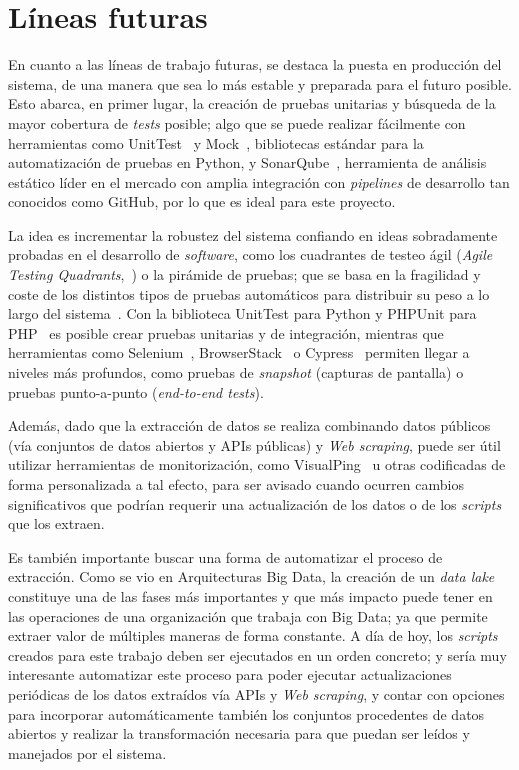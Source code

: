 \section{Líneas futuras}

En cuanto a las líneas de trabajo futuras, se destaca la puesta en producción del sistema, de una manera que sea lo más estable y preparada para el futuro posible. Esto abarca, en primer lugar, la creación de pruebas unitarias y búsqueda de la mayor cobertura de \textit{tests} posible; algo que se puede realizar fácilmente con herramientas como UnitTest~\cite{unittest} y Mock~\cite{mock}, bibliotecas estándar para la automatización de pruebas en Python, y SonarQube~\cite{sonar}, herramienta de análisis estático líder en el mercado con amplia integración con \textit{pipelines} de desarrollo tan conocidos como GitHub, por lo que es ideal para este proyecto.

La idea es incrementar la robustez del sistema confiando en ideas sobradamente probadas en el desarrollo de \textit{software}, como los cuadrantes de testeo ágil (\textit{Agile Testing Quadrants},~\cite{agile_testing_quadrants}) o la pirámide de pruebas; que se basa en la fragilidad y coste de los distintos tipos de pruebas automáticos para distribuir su peso a lo largo del sistema~\cite{testing_pyramid}. Con la biblioteca UnitTest para Python y PHPUnit para PHP~\cite{PHPUnit} es posible crear pruebas unitarias y de integración, mientras que herramientas como Selenium~\cite{selenium}, BrowserStack~\cite{browserstack} o Cypress~\cite{cypress} permiten llegar a niveles más profundos, como pruebas de \textit{snapshot} (capturas de pantalla) o pruebas punto-a-punto (\textit{end-to-end tests}).

Además, dado que la extracción de datos se realiza combinando datos públicos (vía conjuntos de datos abiertos y APIs públicas) y \textit{Web scraping}, puede ser útil utilizar herramientas de monitorización, como VisualPing~\cite{visualping} u otras codificadas de forma personalizada a tal efecto, para ser avisado cuando ocurren cambios significativos que podrían requerir una actualización de los datos o de los \textit{scripts} que los extraen.

Es también importante buscar una forma de automatizar el proceso de extracción. Como se vio en \guillemotleft Arquitecturas Big Data\guillemotright, la creación de un \textit{data lake} constituye una de las fases más importantes y que más impacto puede tener en las operaciones de una organización que trabaja con Big Data; ya que permite extraer valor de múltiples maneras de forma constante. A día de hoy, los \textit{scripts} creados para este trabajo deben ser ejecutados en un orden concreto; y sería muy interesante automatizar este proceso para poder ejecutar actualizaciones periódicas de los datos extraídos vía APIs y \textit{Web scraping}, y contar con opciones para incorporar automáticamente también los conjuntos procedentes de datos abiertos y realizar la transformación necesaria para que puedan ser leídos y manejados por el sistema.


